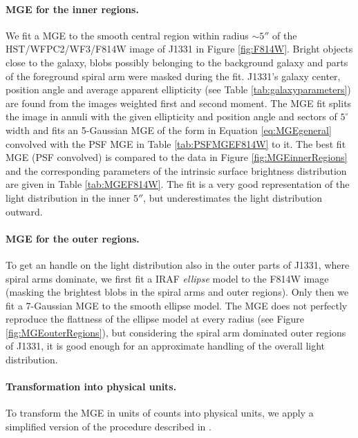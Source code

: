 \paragraph{MGE for the inner regions.} We fit a MGE to the smooth central region within radius $\sim 5''$ of the HST/WFPC2/WF3/F814W image of J1331 in Figure \ref{fig:F814W}. Bright objects  close to the galaxy, blobs possibly belonging to the background galaxy and parts of the foreground spiral arm were masked during the fit. J1331's galaxy center, position angle and average apparent ellipticity (see Table \ref{tab:galaxyparameters}) are found from the images weighted first and second moment. The MGE fit splits the image in annuli with the given ellipticity and position angle and sectors of $5^\circ$ width and fits an 5-Gaussian MGE of the form in Equation \eqref{eq:MGEgeneral} convolved with the PSF MGE in Table \ref{tab:PSFMGEF814W} to it. The best fit MGE (PSF convolved) is compared to the data in Figure \ref{fig:MGEinnerRegions} and the corresponding parameters of the intrinsic surface brightness distribution are given in Table \ref{tab:MGEF814W}. The fit is a very good representation of the light distribution in the inner $5''$, but underestimates the light distribution outward.

\paragraph{MGE for the outer regions.} To get an handle on the light distribution also in the outer parts of J1331, where spiral arms dominate, we first fit a IRAF \citep{1993ASPC...52..173T} \emph{ellipse} model to the F814W image (masking the brightest blobs in the spiral arms and outer regions). Only then we fit a 7-Gaussian MGE to the smooth ellipse model. The MGE does not perfectly reproduce the flattness of the ellipse model at every radius (see Figure \ref{fig:MGEouterRegions}), but considering the spiral arm dominated outer regions of J1331, it is good enough for an approximate handling of the overall light distribution.

\paragraph{Transformation into physical units.} To transform the MGE in units of counts into physical units, we apply a simplified version of the procedure described in \citet{Holtzman}.

